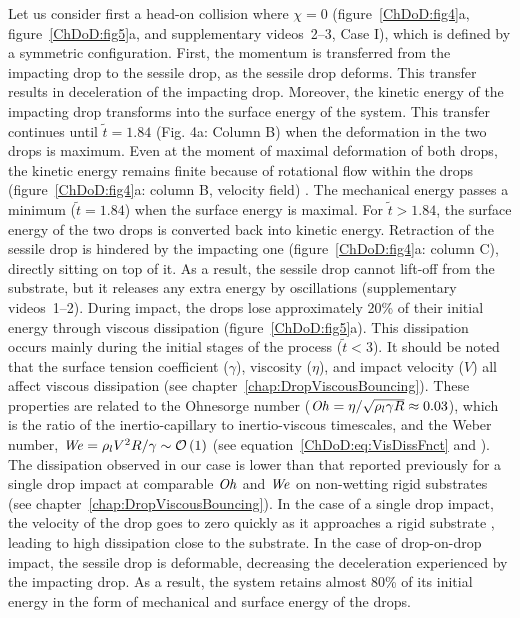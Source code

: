 Let us consider first a head-on collision where $\chi = 0$ (figure~\ref{ChDoD:fig4}a, figure~\ref{ChDoD:fig5}a, and supplementary videos~{\color{Myfig}2--3}, Case I), which is defined by a symmetric configuration. First, the momentum is transferred from the impacting drop to the sessile drop, as the sessile drop deforms. This transfer results in deceleration of the impacting drop. Moreover, the kinetic energy of the impacting drop transforms into the surface energy of the system. This transfer continues until $\tilde{t} = 1.84$ (Fig. 4a: Column B) when the deformation in the two drops is maximum. Even at the moment of maximal deformation of both drops, the kinetic energy remains finite because of rotational flow within the drops (figure~\ref{ChDoD:fig4}a: column B, velocity field) \cite{wildeman2016spreading}. The mechanical energy passes a minimum ($\tilde{t} = 1.84$) when the surface energy is maximal. For $\tilde{t} > 1.84$, the surface energy of the two drops is converted back into kinetic energy. Retraction of the sessile drop is hindered by the impacting one (figure~\ref{ChDoD:fig4}a: column C), directly sitting on top of it. As a result, the sessile drop cannot lift-off from the substrate, but it releases any extra energy by oscillations (supplementary videos~{\color{Myfig}1--2}). During impact, the drops lose approximately 20\% of their initial energy through viscous dissipation (figure~\ref{ChDoD:fig5}a). This dissipation occurs mainly during the initial stages of the process ($\tilde{t} < 3$). It should be noted that the surface tension coefficient ($\gamma$), viscosity ($\eta$), and impact velocity ($V$) all affect viscous dissipation (see chapter~\ref{chap:DropViscousBouncing}). These properties are related to the Ohnesorge number ($\mathit{Oh} = \eta/\sqrt{\rho_l\gamma R} \approx 0.03$), which is the ratio of the inertio-capillary to inertio-viscous timescales, and the Weber number, $\mathit{We} = \rho_lV^2R/\gamma \sim \mathcal{O}\left(1\right)$ (see equation~\eqref{ChDoD:eq:VisDissFnct} and \citep{landau2013course, molavcek2012quasi}). The dissipation observed in our case is lower than that reported previously for a single drop impact at comparable $\mathit{Oh}$ and $\mathit{We}$ on non-wetting rigid substrates (see chapter~\ref{chap:DropViscousBouncing}). In the case of a single drop impact, the velocity of the drop goes to zero quickly as it approaches a rigid substrate \cite{clanet2004}, leading to high dissipation close to the substrate. In the case of drop-on-drop impact, the sessile drop is deformable, decreasing the deceleration experienced by the impacting drop. As a result, the system retains almost 80\% of its initial energy in the form of mechanical and surface energy of the drops. 

